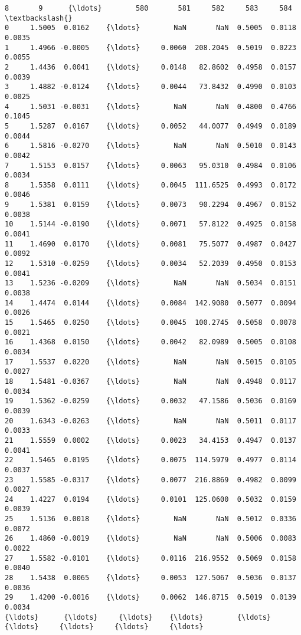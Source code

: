 \documentclass[11pt]{article}
\begin{document}
\begin{Verbatim}[commandchars=\\\{\}]
         8       9      {\ldots}        580       581     582     583     584  \textbackslash{}
0     1.5005  0.0162    {\ldots}        NaN       NaN  0.5005  0.0118  0.0035   
1     1.4966 -0.0005    {\ldots}     0.0060  208.2045  0.5019  0.0223  0.0055   
2     1.4436  0.0041    {\ldots}     0.0148   82.8602  0.4958  0.0157  0.0039   
3     1.4882 -0.0124    {\ldots}     0.0044   73.8432  0.4990  0.0103  0.0025   
4     1.5031 -0.0031    {\ldots}        NaN       NaN  0.4800  0.4766  0.1045   
5     1.5287  0.0167    {\ldots}     0.0052   44.0077  0.4949  0.0189  0.0044   
6     1.5816 -0.0270    {\ldots}        NaN       NaN  0.5010  0.0143  0.0042   
7     1.5153  0.0157    {\ldots}     0.0063   95.0310  0.4984  0.0106  0.0034   
8     1.5358  0.0111    {\ldots}     0.0045  111.6525  0.4993  0.0172  0.0046   
9     1.5381  0.0159    {\ldots}     0.0073   90.2294  0.4967  0.0152  0.0038   
10    1.5144 -0.0190    {\ldots}     0.0071   57.8122  0.4925  0.0158  0.0041   
11    1.4690  0.0170    {\ldots}     0.0081   75.5077  0.4987  0.0427  0.0092   
12    1.5310 -0.0259    {\ldots}     0.0034   52.2039  0.4950  0.0153  0.0041   
13    1.5236 -0.0209    {\ldots}        NaN       NaN  0.5034  0.0151  0.0038   
14    1.4474  0.0144    {\ldots}     0.0084  142.9080  0.5077  0.0094  0.0026   
15    1.5465  0.0250    {\ldots}     0.0045  100.2745  0.5058  0.0078  0.0021   
16    1.4368  0.0150    {\ldots}     0.0042   82.0989  0.5005  0.0108  0.0034   
17    1.5537  0.0220    {\ldots}        NaN       NaN  0.5015  0.0105  0.0027   
18    1.5481 -0.0367    {\ldots}        NaN       NaN  0.4948  0.0117  0.0034   
19    1.5362 -0.0259    {\ldots}     0.0032   47.1586  0.5036  0.0169  0.0039   
20    1.6343 -0.0263    {\ldots}        NaN       NaN  0.5011  0.0117  0.0033   
21    1.5559  0.0002    {\ldots}     0.0023   34.4153  0.4947  0.0137  0.0041   
22    1.5465  0.0195    {\ldots}     0.0075  114.5979  0.4977  0.0114  0.0037   
23    1.5585 -0.0317    {\ldots}     0.0077  216.8869  0.4982  0.0099  0.0027   
24    1.4227  0.0194    {\ldots}     0.0101  125.0600  0.5032  0.0159  0.0039   
25    1.5136  0.0018    {\ldots}        NaN       NaN  0.5012  0.0336  0.0072   
26    1.4860 -0.0019    {\ldots}        NaN       NaN  0.5006  0.0083  0.0022   
27    1.5582 -0.0101    {\ldots}     0.0116  216.9552  0.5069  0.0158  0.0040   
28    1.5438  0.0065    {\ldots}     0.0053  127.5067  0.5036  0.0137  0.0036   
29    1.4200 -0.0016    {\ldots}     0.0062  146.8715  0.5019  0.0139  0.0034   
{\ldots}      {\ldots}     {\ldots}    {\ldots}        {\ldots}       {\ldots}     {\ldots}     {\ldots}     {\ldots}   

\end{Verbatim}
\end{document}
